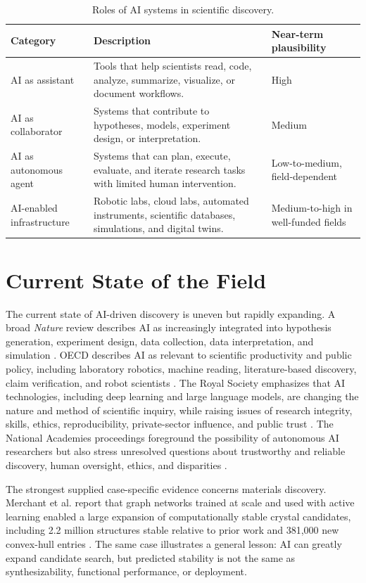 \documentclass[12pt]{article}
\begin{document}
\begin{table}[H]
\centering
\caption{Roles of AI systems in scientific discovery.}
\small
\begin{tabularx}{\textwidth}{p{3.1cm}X p{3.0cm}}
\toprule
\textbf{Category} & \textbf{Description} & \textbf{Near-term plausibility} \\
\midrule
AI as assistant & Tools that help scientists read, code, analyze, summarize, visualize, or document workflows. & High \\
AI as collaborator & Systems that contribute to hypotheses, models, experiment design, or interpretation. & Medium \\
AI as autonomous agent & Systems that can plan, execute, evaluate, and iterate research tasks with limited human intervention. & Low-to-medium, field-dependent \\
AI-enabled infrastructure & Robotic labs, cloud labs, automated instruments, scientific databases, simulations, and digital twins. & Medium-to-high in well-funded fields \\
\bottomrule
\end{tabularx}
\end{table}

\section{Current State of the Field}

The current state of AI-driven discovery is uneven but rapidly expanding. A broad \textit{Nature} review describes AI as increasingly integrated into hypothesis generation, experiment design, data collection, data interpretation, and simulation \cite{ref1}. OECD describes AI as relevant to scientific productivity and public policy, including laboratory robotics, machine reading, literature-based discovery, claim verification, and robot scientists \cite{ref2,ref12}. The Royal Society emphasizes that AI technologies, including deep learning and large language models, are changing the nature and method of scientific inquiry, while raising issues of research integrity, skills, ethics, reproducibility, private-sector influence, and public trust \cite{ref4}. The National Academies proceedings foreground the possibility of autonomous AI researchers but also stress unresolved questions about trustworthy and reliable discovery, human oversight, ethics, and disparities \cite{ref3}.

The strongest supplied case-specific evidence concerns materials discovery. Merchant et al. report that graph networks trained at scale and used with active learning enabled a large expansion of computationally stable crystal candidates, including 2.2 million structures stable relative to prior work and 381,000 new convex-hull entries \cite{ref6}. The same case illustrates a general lesson: AI can greatly expand candidate search, but predicted stability is not the same as synthesizability, functional performance, or deployment.
\end{document}
